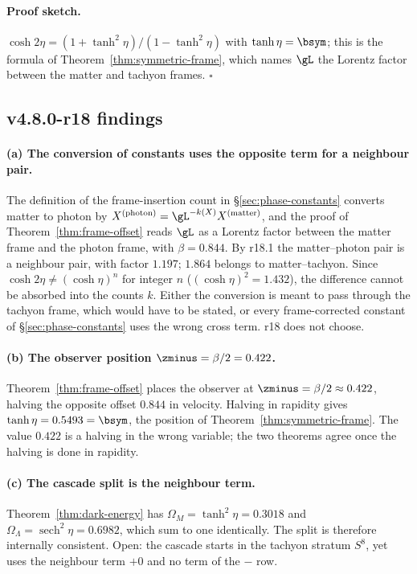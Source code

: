 \paragraph{Proof sketch.}
\(\cosh2\eta=(1+\tanh^2\eta)/(1-\tanh^2\eta)\) with \(\tanh\eta=\bsym\); this is the formula of
Theorem~\ref{thm:symmetric-frame}, which names \(\gL\) the Lorentz factor between the matter and tachyon frames.
\(\square\)

\subsection*{v4.8.0-r18 findings}
\label{subsec:v480-r18-findings}

\paragraph{(a) The conversion of constants uses the opposite term for a neighbour pair.}
The definition of the frame-insertion count in \S\ref{sec:phase-constants} converts matter to photon by
\(X^{(\mathrm{photon})}=\gL^{-k(X)}X^{(\mathrm{matter})}\), and the proof of Theorem~\ref{thm:frame-offset} reads
\(\gL\) as a Lorentz factor between the matter frame and the photon frame, with \(\beta=0.844\).  By r18.1 the
matter--photon pair is a neighbour pair, with factor \(1.197\); \(1.864\) belongs to matter--tachyon.  Since
\(\cosh2\eta\neq(\cosh\eta)^n\) for integer \(n\) (\((\cosh\eta)^2=1.432\)), the difference cannot be absorbed into the
counts \(k\).  Either the conversion is meant to pass through the tachyon frame, which would have to be stated, or
every frame-corrected constant of \S\ref{sec:phase-constants} uses the wrong cross term.  r18 does not choose.

\paragraph{(b) The observer position \(\zminus=\beta/2=0.422\).}
Theorem~\ref{thm:frame-offset} places the observer at \(\zminus=\beta/2\approx0.422\), halving the opposite offset
\(0.844\) in velocity.  Halving in rapidity gives \(\tanh\eta=0.5493=\bsym\), the position of
Theorem~\ref{thm:symmetric-frame}.  The value \(0.422\) is a halving in the wrong variable; the two theorems agree
once the halving is done in rapidity.

\paragraph{(c) The cascade split is the neighbour term.}
Theorem~\ref{thm:dark-energy} has \(\Omega_M=\tanh^2\eta=0.3018\) and \(\Omega_\Lambda=\operatorname{sech}^2\eta=0.6982\),
which sum to one identically.  The split is therefore internally consistent.  Open: the cascade starts in the
tachyon stratum \(S^8\), yet uses the neighbour term \(+0\) and no term of the \(-\) row.

